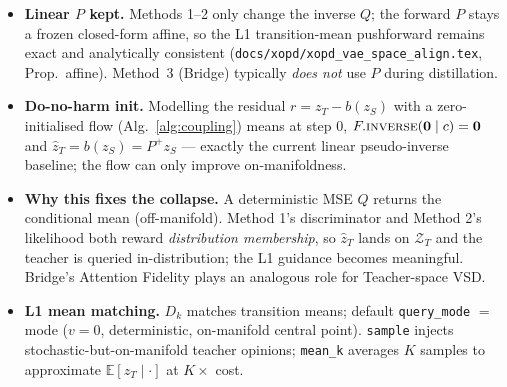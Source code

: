 \documentclass[11pt,a4paper]{article}
\newcommand{\E}{\mathbb{E}}
\newcommand{\Za}{\mathcal{Z}_{T}}
\newcommand{\zT}{z_{T}}
\newcommand{\zS}{z_{S}}
\begin{document}
\begin{itemize}[leftmargin=1.4em,itemsep=2pt]
  \item \textbf{Linear $P$ kept.} Methods 1--2 only change the inverse $Q$; the forward $P$
        stays a frozen closed-form affine, so the L1 transition-mean pushforward remains exact
        and analytically consistent (\texttt{docs/xopd/xopd\_vae\_space\_align.tex}, Prop.~affine).
        Method~3 (Bridge) typically \emph{does not} use $P$ during distillation.
  \item \textbf{Do-no-harm init.} Modelling the residual $r=\zT-b(\zS)$ with a zero-initialised
        flow (Alg.~\ref{alg:coupling}) means at step $0$, $F.\textsc{inverse}(\mathbf{0}\mid c)=\mathbf{0}$
        and $\hat\zT=b(\zS)=P^{+}\zS$ --- exactly the current linear pseudo-inverse baseline; the
        flow can only improve on-manifoldness.
  \item \textbf{Why this fixes the collapse.} A deterministic MSE $Q$ returns the conditional
        mean (off-manifold). Method 1's discriminator and Method 2's likelihood both reward
        \emph{distribution membership}, so $\hat\zT$ lands on $\Za$ and the teacher is queried
        in-distribution; the L1 guidance becomes meaningful. Bridge's Attention Fidelity plays
        an analogous role for Teacher-space VSD.
  \item \textbf{L1 mean matching.} $D_k$ matches transition means; default \texttt{query\_mode}
        $=$ mode ($v{=}0$, deterministic, on-manifold central point). \texttt{sample} injects
        stochastic-but-on-manifold teacher opinions; \texttt{mean\_k} averages $K$ samples to
        approximate $\E[\zT\mid\cdot]$ at $K\times$ cost.
\end{itemize}
\end{document}
